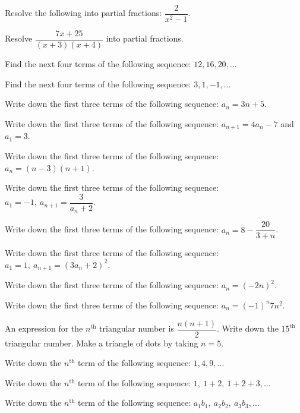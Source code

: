 \documentclass[11pt,a4paper]{article}
\begin{document}
\begin{shortlist}
\item Resolve the following into partial fractions: $\dfrac{2}{x^2-1}$.

\item Resolve $\dfrac{7x+25}{(x+3)(x+4)}$ into partial fractions.

\item Find the next four terms of the following sequence: $12,16,20,\ldots$

\item Find the next four terms of the following sequence: $3,1,-1,\ldots$

\item Write down the first three terms of the following sequence: $a_n=3n+5$.

\item Write down the first three terms of the following sequence: $a_{n+1}=4a_n-7$ and $a_1=3$.

\item Write down the first three terms of the following sequence: $a_n=(n-3)(n+1)$.

\item Write down the first three terms of the following sequence: $a_1=-1,\ a_{n+1}=\dfrac{3}{a_n+2}$.

\item Write down the first three terms of the following sequence: $a_n=8-\dfrac{20}{3+n}$.

\item Write down the first three terms of the following sequence: $a_1=1,\ a_{n+1}=(3a_n+2)^2$.

\item Write down the first three terms of the following sequence: $a_n=(-2n)^2$.

\item Write down the first three terms of the following sequence: $a_n=(-1)^n 7n^2$.

\item An expression for the $n^{\text{th}}$ triangular number is $\dfrac{n(n+1)}{2}$. Write down the $15^{\text{th}}$ triangular number. Make a triangle of dots by taking $n=5$.

\item Write down the $n^{\text{th}}$ term of the following sequence: $1,4,9,\ldots$

\item Write down the $n^{\text{th}}$ term of the following sequence: $1,\ 1+2,\ 1+2+3,\ldots$

\item Write down the $n^{\text{th}}$ term of the following sequence: $a_1b_1,\ a_2b_2,\ a_3b_3,\ldots$


\end{shortlist}
\end{document}
